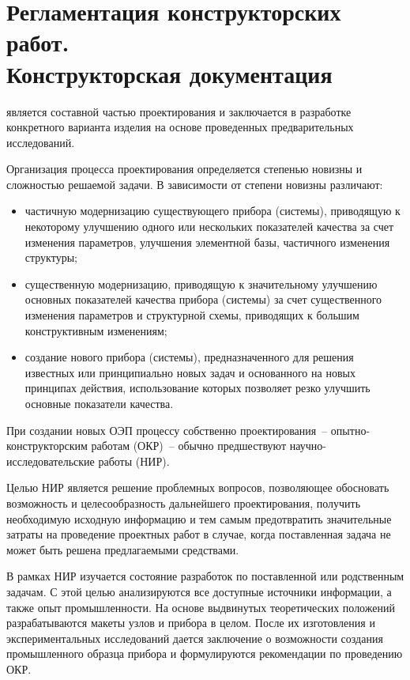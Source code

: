 \chapter[Регламентация конструкторских работ.\break Конструкторская документация]{Регламентация конструкторских работ.\\ Конструкторская документация}

 является составной частью проектирования и заключается в разработке конкретного варианта изделия на основе проведенных предварительных исследований. 

Организация процесса проектирования определяется степенью новизны и сложностью решаемой задачи. В зависимости от степени новизны различают:
\begin{itemize}
	\item частичную модернизацию существующего прибора (системы), приводящую к некоторому улучшению одного или нескольких показателей качества за счет изменения параметров, улучшения элементной базы, частичного изменения структуры;
	\item существенную модернизацию, приводящую к значительному улучшению основных показателей качества прибора (системы) за счет существенного изменения параметров и структурной схемы, приводящих к большим конструктивным изменениям;
	\item создание нового прибора (системы), предназначенного для решения известных или принципиально новых задач и основанного на новых принципах действия, использование которых позволяет резко улучшить основные показатели качества.
\end{itemize}

При создании новых ОЭП процессу собственно проектирования~-- опытно-конструкторским работам (ОКР)~-- обычно предшествуют научно-исследовательские работы (НИР).

Целью НИР является решение проблемных вопросов, позволяющее обосновать возможность и целесообразность дальнейшего проектирования, получить необходимую исходную информацию и тем самым предотвратить значительные затраты на проведение проектных работ в случае, когда поставленная задача не может быть решена предлагаемыми средствами.

В рамках НИР изучается состояние разработок по поставленной или родственным задачам. С этой целью анализируются все доступные источники информации, а также опыт промышленности. На основе выдвинутых теоретических положений разрабатываются макеты узлов и прибора в целом. После их изготовления и экспериментальных исследований дается заключение о возможности создания промышленного образца прибора и формулируются рекомендации по проведению ОКР.

